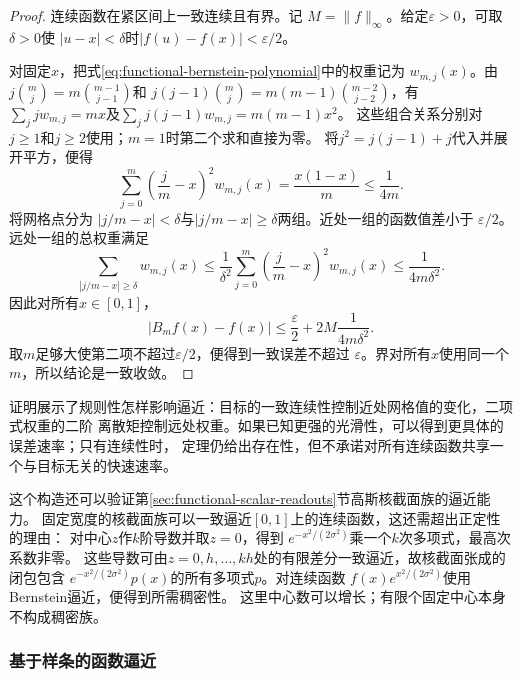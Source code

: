 \begin{proof}
连续函数在紧区间上一致连续且有界。记
$M=\lVert f\rVert_{\infty}$。给定$\varepsilon>0$，可取$\delta>0$使
$|u-x|<\delta$时$|f(u)-f(x)|<\varepsilon/2$。

对固定$x$，把式\eqref{eq:functional-bernstein-polynomial}中的权重记为
$w_{m,j}(x)$。由$j\binom mj=m\binom{m-1}{j-1}$和
$j(j-1)\binom mj=m(m-1)\binom{m-2}{j-2}$，有
$\sum_jj w_{m,j}=mx$及$\sum_jj(j-1)w_{m,j}=m(m-1)x^2$。
这些组合关系分别对$j\geq1$和$j\geq2$使用；$m=1$时第二个求和直接为零。
将$j^2=j(j-1)+j$代入并展开平方，便得
\[
  \sum_{j=0}^{m}
  \left(\frac{j}{m}-x\right)^2w_{m,j}(x)
  =
  \frac{x(1-x)}{m}
  \leq\frac{1}{4m}.
\]
将网格点分为
$|j/m-x|<\delta$与$|j/m-x|\geq\delta$两组。近处一组的函数值差小于
$\varepsilon/2$。远处一组的总权重满足
\[
  \sum_{|j/m-x|\geq\delta}w_{m,j}(x)
  \leq
  \frac{1}{\delta^2}
  \sum_{j=0}^{m}
  \left(\frac{j}{m}-x\right)^2w_{m,j}(x)
  \leq\frac{1}{4m\delta^2}.
\]
因此对所有$x\in[0,1]$，
\[
  |B_mf(x)-f(x)|
  \leq
  \frac{\varepsilon}{2}
  +
  2M\frac{1}{4m\delta^2}.
\]
取$m$足够大使第二项不超过$\varepsilon/2$，便得到一致误差不超过
$\varepsilon$。界对所有$x$使用同一个$m$，所以结论是一致收敛。
\end{proof}

证明展示了规则性怎样影响逼近：目标的一致连续性控制近处网格值的变化，二项式权重的二阶
离散矩控制远处权重。如果已知更强的光滑性，可以得到更具体的误差速率；只有连续性时，
定理仍给出存在性，但不承诺对所有连续函数共享一个与目标无关的快速速率。

这个构造还可以验证第\ref{sec:functional-scalar-readouts}节高斯核截面族的逼近能力。
固定宽度的核截面族可以一致逼近$[0,1]$上的连续函数，这还需超出正定性的理由：
对中心$z$作$k$阶导数并取$z=0$，得到
$e^{-x^2/(2\sigma^2)}$乘一个$k$次多项式，最高次系数非零。
这些导数可由$z=0,h,\ldots,kh$处的有限差分一致逼近，故核截面张成的闭包包含
$e^{-x^2/(2\sigma^2)}p(x)$的所有多项式$p$。对连续函数
$f(x)e^{x^2/(2\sigma^2)}$使用Bernstein逼近，便得到所需稠密性。
这里中心数可以增长；有限个固定中心本身不构成稠密族。
\subsubsection{基于样条的函数逼近}
\label{sec:functional-spline-approximation}

